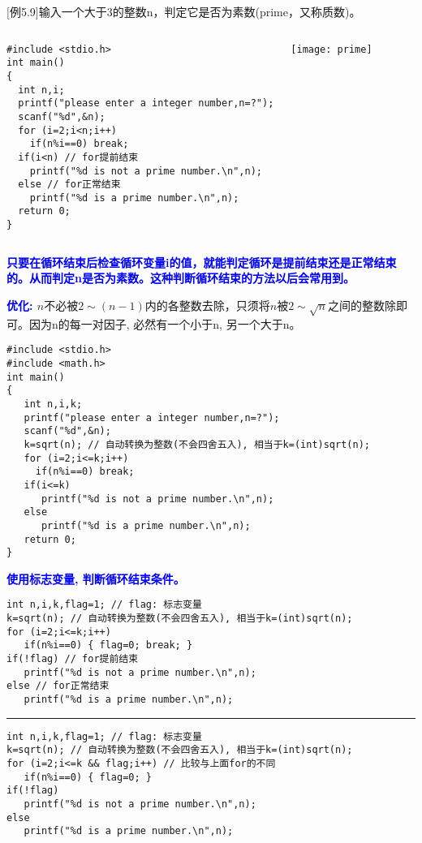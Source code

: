 \begin{frame}
\small
$[$例5.9$]$输入一个大于3的整数n，判定它是否为素数(prime，又称质数)。
\centering
\begin{columns}
\begin{lstlisting}
#include <stdio.h>
int main()
{
  int n,i;
  printf("please enter a integer number,n=?");
  scanf("%d",&n);
  for (i=2;i<n;i++)
    if(n%i==0) break;
  if(i<n) // for提前结束
    printf("%d is not a prime number.\n",n);
  else // for正常结束
    printf("%d is a prime number.\n",n);
  return 0;
}
\end{lstlisting}
	\texttt{[image: prime]}
\end{columns}
\textbf{\textcolor{blue}{只要在循环结束后检查循环变量i的值，就能判定循环是提前结束还是正常结束的。从而判定n是否为素数。这种判断循环结束的方法以后会常用到。}}
\end{frame}

\begin{frame}
\small
\textbf{\textcolor{blue}{优化: }} $n$不必被$2\sim (n-1)$内的各整数去除，只须将$n$被$2\sim\sqrt{n}$之间的整数除即可。因为n的每一对因子, 必然有一个小于n, 另一个大于n。
\begin{lstlisting}
#include <stdio.h>
#include <math.h>
int main()
{
   int n,i,k;
   printf("please enter a integer number,n=?");
   scanf("%d",&n);
   k=sqrt(n); // 自动转换为整数(不会四舍五入), 相当于k=(int)sqrt(n);
   for (i=2;i<=k;i++)
     if(n%i==0) break;
   if(i<=k) 
      printf("%d is not a prime number.\n",n);
   else 
      printf("%d is a prime number.\n",n);
   return 0;
}
\end{lstlisting}
\end{frame}

\begin{frame}
\small
\textbf{\textcolor{blue}{使用标志变量, 判断循环结束条件。}}
\begin{lstlisting}
int n,i,k,flag=1; // flag: 标志变量
k=sqrt(n); // 自动转换为整数(不会四舍五入), 相当于k=(int)sqrt(n);
for (i=2;i<=k;i++)
   if(n%i==0) { flag=0; break; }
if(!flag) // for提前结束
   printf("%d is not a prime number.\n",n);
else // for正常结束
   printf("%d is a prime number.\n",n);
\end{lstlisting}
\pause
\rule{\textwidth}{1pt} %
\begin{lstlisting}
int n,i,k,flag=1; // flag: 标志变量
k=sqrt(n); // 自动转换为整数(不会四舍五入), 相当于k=(int)sqrt(n);
for (i=2;i<=k && flag;i++) // 比较与上面for的不同
   if(n%i==0) { flag=0; }
if(!flag) 
   printf("%d is not a prime number.\n",n);
else 
   printf("%d is a prime number.\n",n);
\end{lstlisting}
\end{frame}

